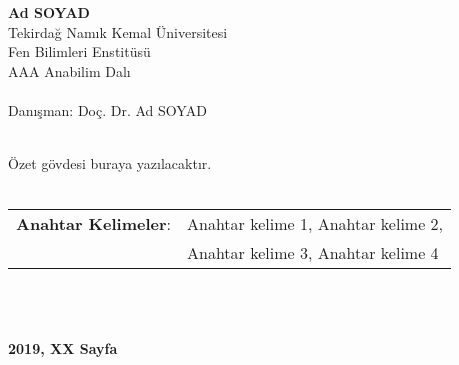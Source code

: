 \begin{center}
	
\textbf{Ad SOYAD}\\
Tekirdağ Namık Kemal Üniversitesi\\
Fen Bilimleri Enstitüsü\\
AAA Anabilim Dalı\\~\\
Danışman: Doç. Dr. Ad SOYAD
\\~\\
\end{center}

\hspace{1.25cm}Özet gövdesi buraya yazılacaktır.
\\~\\
\begin{tabular}{ll}
	\textbf{Anahtar Kelimeler}:& Anahtar kelime 1, Anahtar kelime 2, \\
	& Anahtar kelime 3, Anahtar kelime 4
\end{tabular}
\\~\\
\begin{center}
	\textbf{2019, XX Sayfa}
\end{center}


